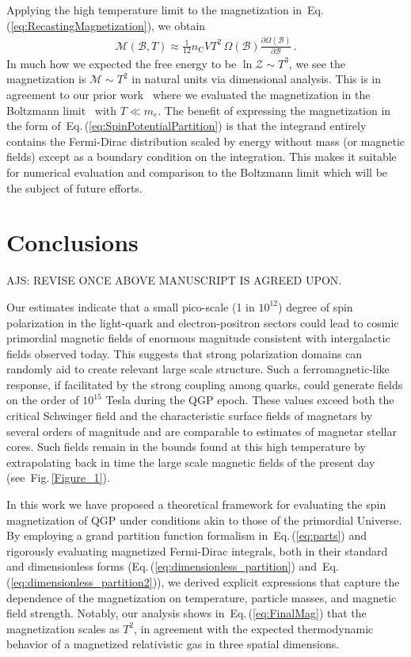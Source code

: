 \documentclass[epjST]{svjour}
\newcommand{\req}[1]{Eq.\,(\ref{#1})}
\newcommand{\rf}[1]{Fig.\,{\ref{#1}}}
\begin{document}
{Applying the high temperature limit to the magnetization in~\req{eq:RecastingMagnetization}, we obtain
\begin{align}
\label{eq:FinalMag}
\mathcal{M}(\mathcal{B},T)\approx\frac{1}{12}n_{\mathrm{C}}VT^2\,\Omega(\mathcal{B})\frac{\partial\Omega(\mathcal{B})}{\partial\mathcal{B}}\,.
\end{align}
}In much how we expected the free energy to be \(\ln\mathcal{Z}\sim T^{3}\), we see the magnetization is \(\mathcal{M}\sim T^{2}\) in natural units via dimensional analysis. This is in agreement to our prior work~\cite{Steinmetz:2023nsc,Steinmetz:2023ucp} where we evaluated the magnetization in the Boltzmann limit~\cite{Steinmetz:2023nsc} with \(T\ll m_e\). The benefit of expressing the magnetization in the form of~\req{eq:SpinPotentialPartition} is that the integrand entirely contains the Fermi-Dirac distribution scaled by energy without mass (or magnetic fields) except as a boundary condition on the integration. This makes it suitable for numerical evaluation and comparison to the Boltzmann limit which will be the subject of future efforts.

\section{Conclusions}
\label{sec:conclusions}

{\color{blue}AJS: REVISE ONCE ABOVE MANUSCRIPT IS AGREED UPON.}

Our estimates indicate that {\color{blue}a small pico-scale (1 in $10^{12}$)} degree of spin polarization in the light-quark and electron-positron sectors could lead to cosmic primordial magnetic fields of enormous magnitude consistent with intergalactic fields observed today. This suggests that strong polarization domains can randomly aid to create relevant large scale structure. Such a ferromagnetic-like response, if facilitated by the strong coupling among quarks, could generate fields on the order of \(10^{15}\) Tesla during the QGP epoch. These values exceed both the critical Schwinger field and the characteristic surface fields of magnetars by several orders of magnitude and are comparable to estimates of magnetar stellar cores. Such fields remain in the bounds found at this high temperature by extrapolating back in time the large scale magnetic fields of the present day (see~\rf{Figure_1}).

In this work we have proposed a theoretical framework for evaluating the spin magnetization of QGP under conditions akin to those of the primordial Universe. By employing a grand partition function formalism in~\req{eq:parts} and rigorously evaluating magnetized Fermi-Dirac integrals, both in their standard and dimensionless forms (\req{eq:dimensionless_partition} and~\req{eq:dimensionless_partition2}), we derived explicit expressions that capture the dependence of the magnetization on temperature, particle masses, and magnetic field strength. Notably, our analysis shows in~\req{eq:FinalMag} that the magnetization scales as \(T^2\), in agreement with the expected thermodynamic behavior of a magnetized relativistic gas in three spatial dimensions.
\end{document}
